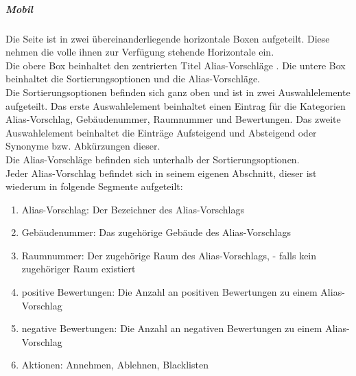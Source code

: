 \begin{center}
    \captionsetup[figure]{labelformat=empty}
    \captionsetup[figure]{labelformat=default}
\end{center}

\subparagraph*{Mobil}
Die Seite ist in zwei übereinanderliegende horizontale Boxen aufgeteilt. Diese nehmen die volle ihnen zur Verfügung stehende Horizontale ein.\\
Die obere Box beinhaltet den zentrierten Titel \dq Alias-Vorschläge \dq.
Die untere Box beinhaltet die Sortierungsoptionen und die Alias-Vorschläge.\\
Die Sortierungsoptionen befinden sich ganz oben und ist in zwei Auswahlelemente aufgeteilt. 
Das erste Auswahlelement beinhaltet einen Eintrag für die Kategorien Alias-Vorschlag, Gebäudenummer, Raumnummer und Bewertungen.
Das zweite Auswahlelement beinhaltet die Einträge \dq Aufsteigend \dq{} und \dq Absteigend \dq{} oder Synonyme bzw. Abkürzungen dieser.\\
Die Alias-Vorschläge befinden sich unterhalb der Sortierungsoptionen.\\
Jeder Alias-Vorschlag befindet sich in seinem eigenen Abschnitt, dieser ist wiederum in folgende Segmente aufgeteilt:

\begin{enumerate}
    \item Alias-Vorschlag: Der Bezeichner des Alias-Vorschlags
    \item Gebäudenummer: Das zugehörige Gebäude des Alias-Vorschlags
    \item Raumnummer: Der zugehörige Raum des Alias-Vorschlags, \dq - \dq{} falls kein zugehöriger Raum existiert
    \item positive Bewertungen: Die Anzahl an positiven Bewertungen zu einem Alias-Vorschlag
    \item negative Bewertungen: Die Anzahl an negativen Bewertungen zu einem Alias-Vorschlag
    \item Aktionen: Annehmen, Ablehnen, Blacklisten
\end{enumerate}

